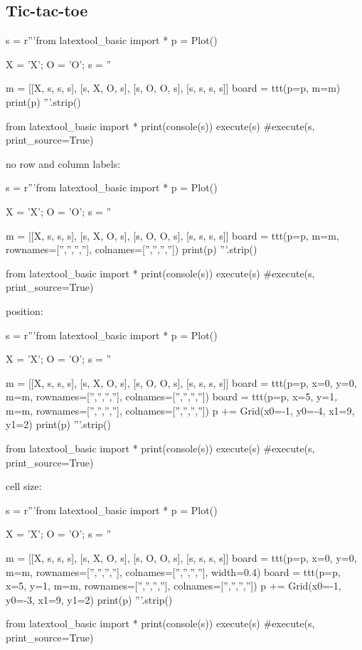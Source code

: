 \subsection{Tic-tac-toe}

\begin{python}
s = r'''from latextool_basic import *
p = Plot()

X = 'X'; O = 'O'; s = ''

m = [[X, s, s, s],
     [s, X, O, s],
     [s, O, O, s],
     [s, s, s, s]]
board = ttt(p=p, m=m)
print(p)
'''.strip()

from latextool_basic import *
print(console(s))
execute(s)
#execute(s, print_source=True)
\end{python}

\newpage
no row and column labels:
\begin{python}
s = r'''from latextool_basic import *
p = Plot()

X = 'X'; O = 'O'; s = ''

m = [[X, s, s, s],
     [s, X, O, s],
     [s, O, O, s],
     [s, s, s, s]]
board = ttt(p=p, m=m,
            rownames=['','','',''], colnames=['','','',''])
print(p)
'''.strip()

from latextool_basic import *
print(console(s))
execute(s)
#execute(s, print_source=True)
\end{python}

\newpage
position:
\begin{python}
s = r'''from latextool_basic import *
p = Plot()

X = 'X'; O = 'O'; s = ''

m = [[X, s, s, s],
     [s, X, O, s],
     [s, O, O, s],
     [s, s, s, s]]
board = ttt(p=p, x=0, y=0,
            m=m,
            rownames=['','','',''], colnames=['','','',''])
board = ttt(p=p, x=5, y=1,
            m=m,
            rownames=['','','',''], colnames=['','','',''])
p += Grid(x0=-1, y0=-4, x1=9, y1=2)
print(p)
'''.strip()

from latextool_basic import *
print(console(s))
execute(s)
#execute(s, print_source=True)
\end{python}

\newpage
cell size:
\begin{python}
s = r'''from latextool_basic import *
p = Plot()

X = 'X'; O = 'O'; s = ''

m = [[X, s, s, s],
     [s, X, O, s],
     [s, O, O, s],
     [s, s, s, s]]
board = ttt(p=p, x=0, y=0,
            m=m,
            rownames=['','','',''], colnames=['','','',''],
            width=0.4)
board = ttt(p=p, x=5, y=1,
            m=m,
            rownames=['','','',''], colnames=['','','',''])
p += Grid(x0=-1, y0=-3, x1=9, y1=2)
print(p)
'''.strip()

from latextool_basic import *
print(console(s))
execute(s)
#execute(s, print_source=True)
\end{python}




